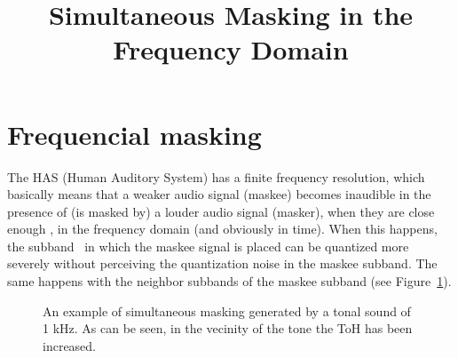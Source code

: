 

\title{Simultaneous Masking in the Frequency Domain}


\maketitle

\section{Frequencial masking}
The HAS (Human Auditory System) has a finite frequency resolution,
which basically means that a weaker audio signal (maskee) becomes
inaudible in the presence of (is masked by) a louder audio signal
(masker), when they are close enough \cite{bosi2003intro}, in the
frequency domain (and obviously in time). When this happens, the
subband~\cite{vetterli1995wavelets} in which the maskee signal is
placed can be quantized more severely without perceiving the
quantization noise in the maskee subband.  The same happens with the
neighbor subbands of the maskee subband (see Figure~\ref{fig:SM}).

\begin{figure}
  \centering
  \caption{An example of simultaneous masking generated by a tonal
    sound of 1 kHz. As can be seen, in the vecinity of the tone the
    ToH has been increased.}
  \label{fig:SM}
\end{figure}


